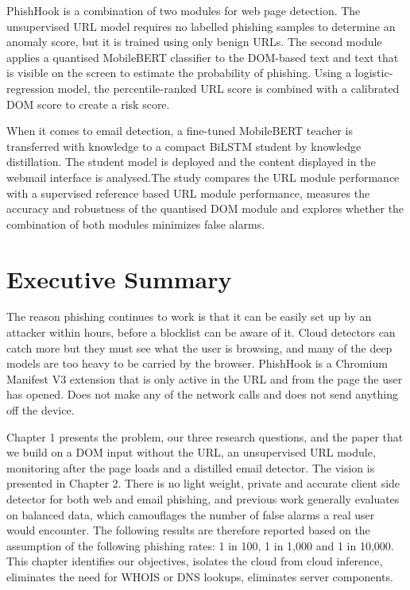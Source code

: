 \documentclass{FastFyp}
\begin{document}
PhishHook is a combination of two modules for web page detection. The unsupervised URL model requires no labelled phishing samples to determine an anomaly score, but it is trained using only benign URLs. The second module applies a quantised MobileBERT classifier to the DOM-based text and text that is visible on the screen to estimate the probability of phishing. Using a logistic-regression model, the percentile-ranked URL score is combined with a calibrated DOM score to create a risk score.

When it comes to email detection, a fine-tuned MobileBERT teacher is transferred with knowledge to a compact BiLSTM student by knowledge distillation. The student model is deployed and the content displayed in the webmail interface is analysed.The study compares the URL module performance with a supervised reference based URL module performance, measures the accuracy and robustness of the quantised DOM module and explores whether the combination of both modules minimizes false alarms.

\vspace{0.5em}



\pagebreak

\section*{Executive Summary}
The reason phishing continues to work is that it can be easily set up by an attacker within hours, before a blocklist can be aware of it. Cloud detectors can catch more but they must see what the user is browsing, and many of the deep models are too heavy to be carried by the browser. PhishHook is a Chromium Manifest V3 extension that is only active in the URL and from the page the user has opened. Does not make any of the network calls and does not send anything off the device.

Chapter 1 presents the problem, our three research questions, and the paper that we build on a DOM input without the URL, an unsupervised URL module, monitoring after the page loads and a distilled email detector. The vision is presented in Chapter 2. There is no light weight, private and accurate client side detector for both web and email phishing, and previous work generally evaluates on balanced data, which camouflages the number of false alarms a real user would encounter. The following results are therefore reported based on the assumption of the following phishing rates: 1 in 100, 1 in 1,000 and 1 in 10,000. This chapter identifies our objectives, isolates the cloud from cloud inference, eliminates the need for WHOIS or DNS lookups, eliminates server components.
\end{document}
